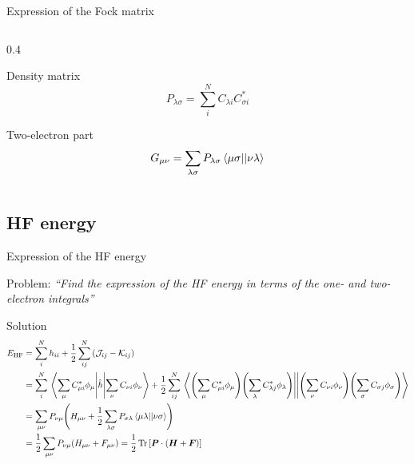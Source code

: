 \documentclass[aspectratio=169,9pt]{beamer}
\newcommand{\bP}{\boldsymbol{P}}
\newcommand{\bF}{\boldsymbol{F}}
\newcommand{\bH}{\boldsymbol{H}}
\newcommand{\hh}{\Hat{h}}
\newcommand{\cJ}{\mathcal{J}}
\newcommand{\cK}{\mathcal{K}}
\newcommand{\violet}[1]{\textcolor{hfViolet}{#1}}
\begin{document}
\begin{frame}{Expression of the Fock matrix}
\begin{columns}
\begin{column}{0.4\textwidth}
         	\begin{block}{Density matrix}
     		  	\begin{equation*}
	        		P_{\lambda\sigma} = \sum_i^N C_{\lambda i} C_{\sigma i}^*
    	    	\end{equation*}
        	\end{block}
         	\begin{block}{Two-electron part}
     		  	\begin{equation*}
	        		G_{\mu\nu} = \sum_{\lambda\sigma} P_{\lambda\sigma} \mel{\mu\sigma}{}{\nu\lambda}
    	    	\end{equation*}
        	\end{block}
		\end{column}
	\end{columns}
\end{frame}

\subsection{HF energy}
\begin{frame}{Expression of the HF energy}
	\begin{block}{Problem:}
		\violet{\textit{``Find the expression of the HF energy in terms of the one- and two-electron integrals''}}
	\end{block}
	\pause
	\begin{block}{Solution}
		\begin{equation*}
			\begin{split}
				E_\text{HF} 
				& = \sum_i^N h_{ii} + \frac{1}{2} \sum_{ij}^N \qty(\cJ_{ij} - \cK_{ij}) 
				\\
				& = \sum_i^N  \mel{\sum_\mu C_{\mu i}^* \phi_\mu}{\hh}{  \sum_\nu C_{\nu i} \phi_\nu} 
				+ \frac{1}{2} \sum_{ij}^N \mel{ \qty(\sum_\mu C_{\mu i}^* \phi_\mu) \qty(\sum_\lambda C_{\lambda j}^* \phi_\lambda)} {} { \qty(\sum_\nu C_{\nu i} \phi_\nu) \qty(\sum_\sigma C_{\sigma j} \phi_\sigma)}
				\\
				& = \sum_{\mu\nu} P_{\nu\mu} \qty( H_{\mu\nu} + \frac{1}{2} \sum_{\lambda\sigma} P_{\sigma\lambda} \mel{\mu\lambda }{}{\nu\sigma} )
				\\
				& = \frac{1}{2} \sum_{\mu\nu} P_{\nu\mu} \qty( H_{\mu\nu} + F_{\mu\nu} ) = \frac{1}{2} \Tr\qty[\bP \cdot (\bH + \bF)]
			\end{split}
		\end{equation*}
	\end{block}
\end{frame}
\end{document}
